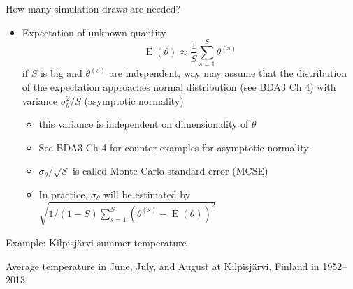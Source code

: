 \documentclass[finnish,english,t]{beamer}
\DeclareMathOperator{\E}{E}
\begin{document}
\begin{frame}{How many simulation draws are needed?}

  \begin{itemize}
  \item Expectation of unknown quantity
    \begin{equation*}
      \E(\theta)\approx \frac{1}{S}\sum_{s=1}^S \theta^{(s)}
    \end{equation*}
    if $S$ is big and $\theta^{(s)}$ are independent, way may assume
    that the distribution of the expectation approaches normal
    distribution (see BDA3 Ch 4) with variance $\sigma^2_\theta/S$
    (asymptotic normality)
    \begin{itemize}
    \item this variance is independent on dimensionality of $\theta$
      \pause
    \item See BDA3 Ch 4 for counter-examples for asymptotic normality
      \pause
    \item $\sigma_\theta/\sqrt{S}$ is called Monte Carlo standard
      error (MCSE)
      \pause
      \item In practice, $\sigma_{\theta}$ will be estimated by $ \sqrt{1/(1-S)\sum_{s = 1}^S (\theta^{(s)} - \E(\theta))^2}$
    \end{itemize}
\end{itemize}

\end{frame}

\begin{frame}{Example: Kilpisjärvi summer temperature}

  Average temperature in June, July, and August at Kilpisjärvi,
  Finland in 1952--2013

  \begin{center}
  \end{center}

\end{frame}
\end{document}
